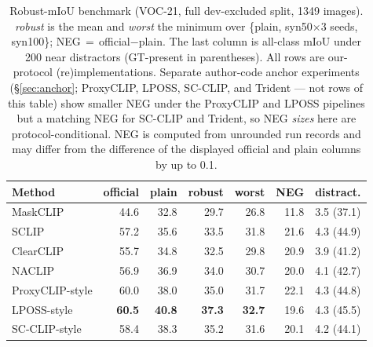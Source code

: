 \documentclass[11pt]{article}
\newcommand{\miou}{mIoU}
\begin{document}
\begin{table}[t]
\centering
\small
\caption{Robust-mIoU benchmark (VOC-21, full dev-excluded split, 1349 images).
\emph{robust} is the mean and \emph{worst} the minimum over \{plain,
syn50$\times$3 seeds, syn100\}; NEG$\,=\,$official$-$plain. The last column is
all-class \miou{} under 200 near distractors (GT-present in parentheses).
All rows are our-protocol (re)implementations. Separate author-code anchor
experiments (\S\ref{sec:anchor}; ProxyCLIP, LPOSS, SC-CLIP, and Trident ---
not rows of this table) show smaller NEG under the ProxyCLIP and LPOSS
pipelines but a matching NEG for SC-CLIP and Trident, so NEG \emph{sizes}
here are protocol-conditional. NEG is computed from unrounded run records
and may differ from the difference of the displayed official and plain
columns by up to 0.1.}
\label{tab:robustbench}
\begin{tabular}{lrrrrrr}
\toprule
Method & official & plain & robust & worst & NEG & distract. \\
\midrule
MaskCLIP & 44.6 & 32.8 & 29.7 & 26.8 & 11.8 & 3.5 (37.1) \\
SCLIP & 57.2 & 35.6 & 33.5 & 31.8 & 21.6 & 4.3 (44.9) \\
ClearCLIP & 55.7 & 34.8 & 32.5 & 29.8 & 20.9 & 3.9 (41.2) \\
NACLIP & 56.9 & 36.9 & 34.0 & 30.7 & 20.0 & 4.1 (42.7) \\
ProxyCLIP-style & 60.0 & 38.0 & 35.0 & 31.7 & 22.1 & 4.3 (44.8) \\
LPOSS-style & \textbf{60.5} & \textbf{40.8} & \textbf{37.3} & \textbf{32.7} & 19.6 & 4.3 (45.5) \\
SC-CLIP-style & 58.4 & 38.3 & 35.2 & 31.6 & 20.1 & 4.2 (44.1) \\
\bottomrule
\end{tabular}
\end{table}
\end{document}
